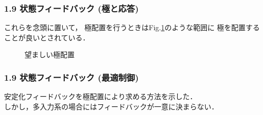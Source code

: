 \begin{frame}[t]
\frametitle{1.9 状態フィードバック (極と応答)}
これらを念頭に置いて，
極配置を行うときはFig.\ref{fig_pole}のような範囲に
極を配置することが良いとされている．
\begin{figure}
 \begin{center}
  
  \caption{望ましい極配置}
  \label{fig_pole}
 \end{center}
\end{figure}
\end{frame}


\begin{frame}[t]
\frametitle{1.9 状態フィードバック (最適制御)}
安定化フィードバックを極配置により求める方法を示した．\\
しかし，多入力系の場合にはフィードバックが一意に決まらない．


\end{frame}
